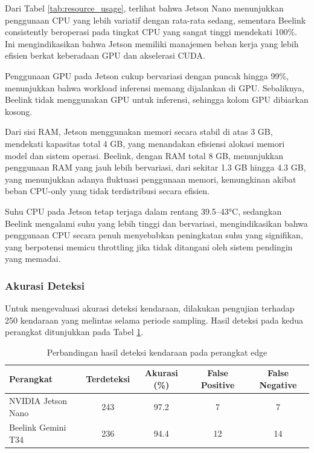 Dari Tabel \ref{tab:resource_usage}, terlihat bahwa Jetson Nano menunjukkan penggunaan CPU yang lebih variatif dengan rata-rata sedang, sementara Beelink consistently beroperasi pada tingkat CPU yang sangat tinggi mendekati 100\%. Ini mengindikasikan bahwa Jetson memiliki manajemen beban kerja yang lebih efisien berkat keberadaan GPU dan akselerasi CUDA.

Penggunaan GPU pada Jetson cukup bervariasi dengan puncak hingga 99\%, menunjukkan bahwa workload inferensi memang dijalankan di GPU. Sebaliknya, Beelink tidak menggunakan GPU untuk inferensi, sehingga kolom GPU dibiarkan kosong.

Dari sisi RAM, Jetson menggunakan memori secara stabil di atas 3 GB, mendekati kapasitas total 4 GB, yang menandakan efisiensi alokasi memori model dan sistem operasi. Beelink, dengan RAM total 8 GB, menunjukkan penggunaan RAM yang jauh lebih bervariasi, dari sekitar 1.3 GB hingga 4.3 GB, yang menunjukkan adanya fluktuasi penggunaan memori, kemungkinan akibat beban CPU-only yang tidak terdistribusi secara efisien.

Suhu CPU pada Jetson tetap terjaga dalam rentang 39.5--43°C, sedangkan Beelink mengalami suhu yang lebih tinggi dan bervariasi, mengindikasikan bahwa penggunaan CPU secara penuh menyebabkan peningkatan suhu yang signifikan, yang berpotensi memicu throttling jika tidak ditangani oleh sistem pendingin yang memadai.


\subsubsection{Akurasi Deteksi}

Untuk mengevaluasi akurasi deteksi kendaraan, dilakukan pengujian terhadap 250 kendaraan yang melintas selama periode sampling. Hasil deteksi pada kedua perangkat ditunjukkan pada Tabel \ref{tab:detection_results}.

\begin{table}[htbp]
  \centering
  \begin{tabular}{|l|c|c|c|c|}
  \hline
  \rowcolor[HTML]{C0C0C0}
  \textbf{Perangkat} & \textbf{Terdeteksi} & \textbf{Akurasi (\%)} & \textbf{False Positive} & \textbf{False Negative} \\
  \hline
  NVIDIA Jetson Nano & 243 & 97.2 & 7 & 7 \\
  \hline
  Beelink Gemini T34 & 236 & 94.4 & 12 & 14 \\
  \hline
  \end{tabular}
  \caption{Perbandingan hasil deteksi kendaraan pada perangkat edge}
  \label{tab:detection_results}
\end{table}

